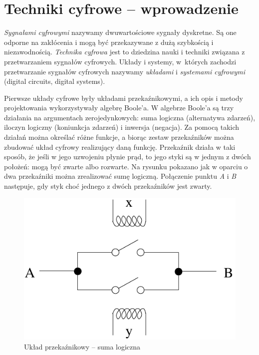 \documentclass[a4paper,11pt]{article}
\begin{document}
 
\section*{Techniki cyfrowe -- wprowadzenie}
\emph{Sygnałami cyfrowymi} nazywamy dwuwartościowe sygnały dyskretne. Są one odporne na zakłócenia i mogą być przekazywane z dużą szybkością i niezawodnością. \emph{Technika cyfrowa} jest to dziedzina nauki i techniki związana z przetwarzaniem sygnałów cyfrowych. Układy i systemy, w~których zachodzi przetwarzanie sygnałów cyfrowych nazywamy \emph{układami} i \emph{systemami cyfrowymi} (digital circuits, digital systems).

Pierwsze układy cyfrowe były układami przekaźnikowymi, a ich opis i metody projektowania wykorzystywały algebrę Boole'a. W algebrze Boole'a są trzy działania na argumentach zerojedynkowych: suma logiczna (alternatywa zdarzeń), iloczyn logiczny (koniunkcja zdarzeń) i inwersja (negacja). Za pomocą takich działań można określać różne funkcje, a biorąc zestaw przekaźników można zbudować układ cyfrowy realizujący daną funkcję. Przekaźnik działa w taki sposób, że jeśli w jego uzwojeniu płynie prąd, to jego styki są w jednym z dwóch położeń: mogą być zwarte albo rozwarte. Na rysunku pokazano jak w oparciu o dwa przekaźniki można zrealizować sumę logiczną. Połączenie punktu \emph{A} i \emph{B} następuje, gdy styk choć jednego z dwóch przekaźników jest zwarty.

\begin{figure}[!htb]
\centerline{\includegraphics[scale=0.6]{source/uklad-przekaznikowy.pdf}}
\caption{Układ przekaźnikowy -- suma logiczna}
\label{fig:ukladPrzekaznikowy}
\end{figure}
\end{document}
